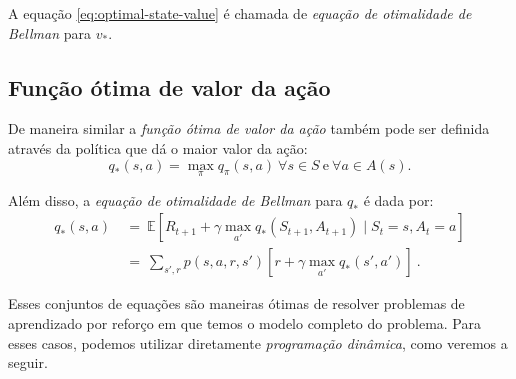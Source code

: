 \documentclass{article}
\begin{document}
            A equação \eqref{eq:optimal-state-value} é chamada de \emph{equação de otimalidade de Bellman} para $v_*$. 
        
        \subsection{Função ótima de valor da ação}
        
            De maneira similar a \emph{função ótima de valor da ação} também pode ser definida através da política que dá o maior valor da ação:
            \begin{equation}
                q_*(s, a) = \max_{\pi} q_{\pi}(s, a)\ \forall s \in S\ \text{e}\ \forall a \in A(s).
            \end{equation}

            Além disso, a \emph{equação de otimalidade de Bellman} para $q_*$ é dada por:
            \begin{equation}
            \label{eq:optimal-action-value}
            \begin{split}
                q_*(s, a) & \ = \ \mathbb{E} [R_{t+1} + \gamma \max_{a'} q_*(S_{t+1}, A_{t+1}) \mid S_t = s, A_t = a] \\
                & \ = \ \sum_{s', r} p(s, a, r, s') [r + \gamma \max_{a'} q_*(s', a')]\ .
            \end{split}
            \end{equation}

            Esses conjuntos de equações são maneiras ótimas de resolver problemas de aprendizado por reforço em que temos o modelo completo do problema. Para esses casos, podemos utilizar diretamente \emph{programação dinâmica}, como veremos a seguir.
\end{document}
